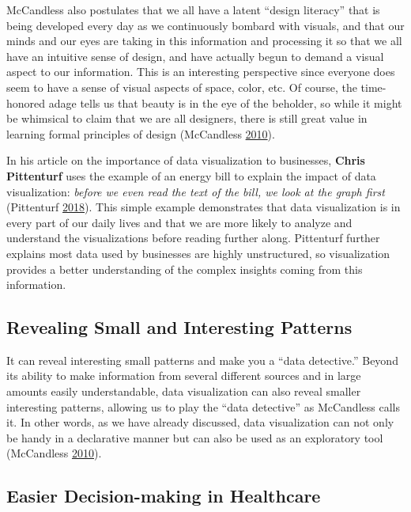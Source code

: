 \documentclass[]{book}
\begin{document}
McCandless also postulates that we all have a latent ``design literacy'' that is being developed every day as we continuously bombard with visuals, and that our minds and our eyes are taking in this information and processing it so that we all have an intuitive sense of design, and have actually begun to demand a visual aspect to our information. This is an interesting perspective since everyone does seem to have a sense of visual aspects of space, color, etc. Of course, the time-honored adage tells us that beauty is in the eye of the beholder, so while it might be whimsical to claim that we are all designers, there is still great value in learning formal principles of design (McCandless \protect\hyperlink{ref-viz_ted}{2010}).

In his article on the importance of data visualization to businesses, \textbf{Chris Pittenturf} uses the example of an energy bill to explain the impact of data visualization: \emph{before we even read the text of the bill, we look at the graph first} (Pittenturf \protect\hyperlink{ref-viz_importance}{2018}). This simple example demonstrates that data visualization is in every part of our daily lives and that we are more likely to analyze and understand the visualizations before reading further along. Pittenturf further explains most data used by businesses are highly unstructured, so visualization provides a better understanding of the complex insights coming from this information.

\hypertarget{revealing-small-and-interesting-patterns}{%
\subsection{Revealing Small and Interesting Patterns}\label{revealing-small-and-interesting-patterns}}

It can reveal interesting small patterns and make you a ``data detective.'' Beyond its ability to make information from several different sources and in large amounts easily understandable, data visualization can also reveal smaller interesting patterns, allowing us to play the ``data detective'' as McCandless calls it. In other words, as we have already discussed, data visualization can not only be handy in a declarative manner but can also be used as an exploratory tool (McCandless \protect\hyperlink{ref-viz_ted}{2010}).

\hypertarget{easier-decision-making-in-healthcare}{%
\subsection{Easier Decision-making in Healthcare}\label{easier-decision-making-in-healthcare}}
\end{document}
